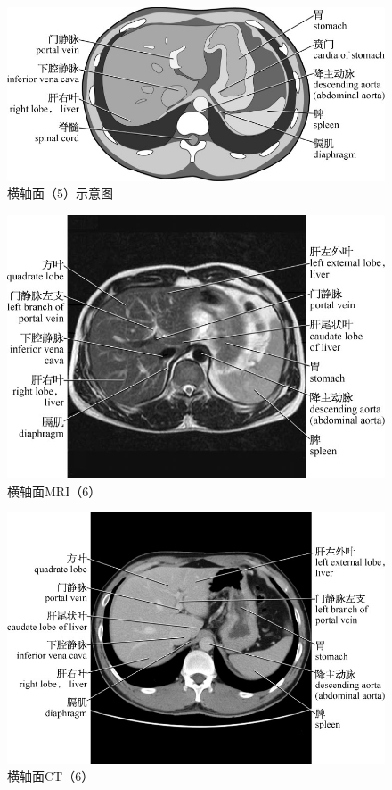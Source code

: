 \begin{figure}[!htbp]
 \centering
 \includegraphics{./images/Image00016.jpg}
 \captionsetup{justification=centering}
 \caption{横轴面（5）示意图}
  \end{figure} 
 \FloatBarrier

\begin{figure}[!htbp]
 \centering
 \includegraphics{./images/Image00017.jpg}
 \captionsetup{justification=centering}
 \caption{横轴面MRI（6）}
  \end{figure} 
 \FloatBarrier

\begin{figure}[!htbp]
 \centering
 \includegraphics{./images/Image00018.jpg}
 \captionsetup{justification=centering}
 \caption{横轴面CT（6）}
  \end{figure} 
 \FloatBarrier

